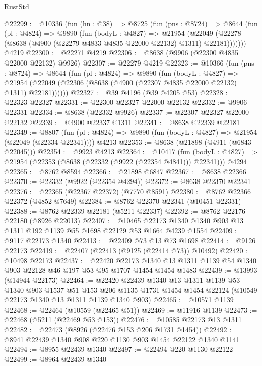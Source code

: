 \begin{lexlean}{RustStd}
\begin{coremodule}
@22299 := @10336
    (fun (hn : @38) =>
    @8725
      (fun (pns : @8724) =>
      @8644
        (fun (pl : @4824) =>
        @9890
          (fun (bodyL : @4827) =>
          @21954
            (@22049 (@22278 (@8638 (@4900 (@22279 @4833 @4835 @22000 @22132) @1311) @22181)))))))
    @4219
@22300 := @22271 @4219
@22306 := @8638 (@9906 (@22300 @4835 @22000 @22132) @9926)
@22307 := @22279 @4219
@22323 := @10366
    (fun (pns : @8724) =>
    @8644
      (fun (pl : @4824) =>
      @9890
        (fun (bodyL : @4827) =>
        @21954 (@22049 (@22306 (@8638 (@4900 (@22307 @4835 @22000 @22132) @1311) @22181))))))
@22327 := @39 @4196 (@39 @4205 @53)
@22328 := @22323 @22327
@22331 := @22300 @22327 @22000 @22132
@22332 := @9906 @22331
@22334 := @8638 (@22332 @9926)
@22337 := @22307 @22327 @22000 @22132
@22339 := @4900 @22337 @1311
@22341 := @8638 @22339 @22181
@22349 := @8807
    (fun (pl : @4824) => @9890 (fun (bodyL : @4827) => @21954 (@22049 (@22334 @22341))))
    @4213
@22353 := @8638 (@21898 (@4911 (@6843 @22045)))
@22354 := @9923 @4213
@22364 := @10417
    (fun (bodyL : @4827) => @21954 (@22353 (@8638 (@22332 (@9922 (@22354 @4841))) @22341)))
    @4294
@22365 := @8762 @8594
@22366 := @21898 @6847
@22367 := @8638 @22366
@22370 := @22332 (@9922 (@22354 @4294))
@22372 := @8638 @22370 @22341
@22376 := @22365 (@22367 @22372) (@7770 @8591)
@22380 := @8762 @22366 @22372 (@4852 @7649)
@22384 := @8762 @22370 @22341 (@10451 @22331)
@22388 := @8762 @22339 @22181 (@5211 @22337)
@22392 := @8762 @22176 @22180 (@8926 @22013)
@22407 := @10465 @22173 @1340 @1340 @903 @13 @1311 @192 @1139 @55 @1698 @22129 @53 @1664 @4239 @1554
@22409 := @9117 @22173 @1340
@22413 := @22409 @73 @13 @73 @1698
@22414 := @9126 @22173
@22419 := @22407 (@22413 (@9125 (@22414 @73)) @10492)
@22420 := @10498 @22173
@22437 := @22420
    @22173
    @1340
    @13
    @1311
    @1139
    @54
    @1340
    @903
    @22128
    @46
    @197
    @53
    @95
    @1707
    @1454
    @1454
    @1483
@22439 := @13993 (@14944 @22173)
@22464 := @22420
    @22439
    @1340
    @13
    @1311
    @1139
    @53
    @1340
    @903
    @1537
    @51
    @153
    @206
    @1135
    @1731
    @1454
    @1454
    @22124
    (@10549 @22173 @1340 @13 @1311 @1139 @1340 @903)
@22465 := @10571 @1139
@22468 := @22464 (@10559 (@22465 @51))
@22469 := @11916 @1139
@22473 := @22468 (@5211 (@22469 @53 @153))
@22476 := @10585 @22173 @13 @1311
@22482 := @22473 (@8926 (@22476 @153 @206 @1731 @1454))
@22492 := @8941 @22439 @1340 @908 @220 @1130 @903 @1454 @22122 @1340 @1141
@22494 := @8955 @22439 @1340
@22497 := @22494 @220 @1130 @22122
@22499 := @8964 @22439 @1340

\end{coremodule}
\end{lexlean}
